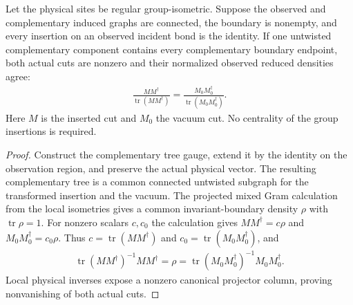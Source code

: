\begin{lemma}
    \label{lem:peps_anchored_twist_density}
    \leanok
    Let the physical sites be regular group-isometric. Suppose the observed
    and complementary induced graphs are connected, the boundary is
    nonempty, and every insertion on an observed incident bond is the
    identity. If one untwisted complementary component contains every
    complementary boundary endpoint, both actual cuts are nonzero and
    their normalized observed reduced densities agree:
    \begin{align}
        \frac{MM^\dagger}{\operatorname{tr}(MM^\dagger)}
        =\frac{M_0M_0^\dagger}{\operatorname{tr}(M_0M_0^\dagger)}.
        \label{eq:peps_anchored_twist_density}
    \end{align}
    Here $M$ is the inserted cut and $M_0$ the vacuum cut.
    No centrality of the group insertions is required.
\end{lemma}
\begin{proof}\leanok
    Construct the complementary tree gauge, extend it by the identity on
    the observation region, and preserve the actual physical vector.
    The resulting complementary tree is a common connected untwisted
    subgraph for the transformed insertion and the vacuum. The projected
    mixed Gram calculation from the local isometries gives a common
    invariant-boundary density $\rho$ with $\operatorname{tr}\rho=1$.
    For nonzero scalars $c,c_0$ the calculation gives
    $MM^\dagger=c\rho$ and $M_0M_0^\dagger=c_0\rho$.
    Thus $c=\operatorname{tr}(MM^\dagger)$ and
    $c_0=\operatorname{tr}(M_0M_0^\dagger)$, and
    \begin{align}
        \operatorname{tr}(MM^\dagger)^{-1}MM^\dagger
        =\rho
        =\operatorname{tr}(M_0M_0^\dagger)^{-1}M_0M_0^\dagger.
        \label{eq:peps_anchored_twist_common_density}
    \end{align} Local physical
    inverses expose a nonzero canonical projector column, proving
    nonvanishing of both actual cuts.
\end{proof}
